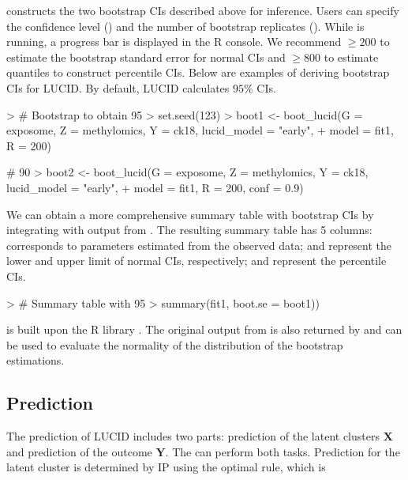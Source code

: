 constructs the two bootstrap CIs described above for inference. Users can specify the confidence level () and the number of bootstrap replicates (). While  is running, a progress bar is displayed in the R console. We recommend  $\geq 200$ to estimate the bootstrap standard error for normal CIs and  $\geq 800$ to estimate quantiles to construct percentile CIs. Below are examples of deriving bootstrap CIs for LUCID. By default, LUCID calculates $95\%$ CIs.

\begin{example}
> # Bootstrap to obtain 95%
> set.seed(123)
> boot1 <- boot_lucid(G = exposome, Z = methylomics, Y = ck18, lucid_model = "early",
+                     model = fit1, R = 200)

# 90%
> boot2 <- boot_lucid(G = exposome, Z = methylomics, Y = ck18, lucid_model = "early",
+                     model = fit1, R = 200, conf = 0.9)
\end{example}

We can obtain a more comprehensive summary table with bootstrap CIs by integrating  with output from . The resulting summary table has 5 columns:  corresponds to parameters estimated from the observed data;  and  represent the lower and upper limit of normal CIs, respectively;  and  represent the percentile CIs.

\begin{example}
> # Summary table with 95%
> summary(fit1, boot.se = boot1))
\end{example}

 is built upon the R library  \citep{canty2021boot}. The original output from  is also returned by  and can be used to evaluate the normality of the distribution of the bootstrap estimations.


\subsection{Prediction}

The prediction of LUCID includes two parts: prediction of the latent clusters $\bm X$ and prediction of the outcome $\bm Y$. The  can perform both tasks. Prediction for the latent cluster is determined by IP using the optimal rule, which is

